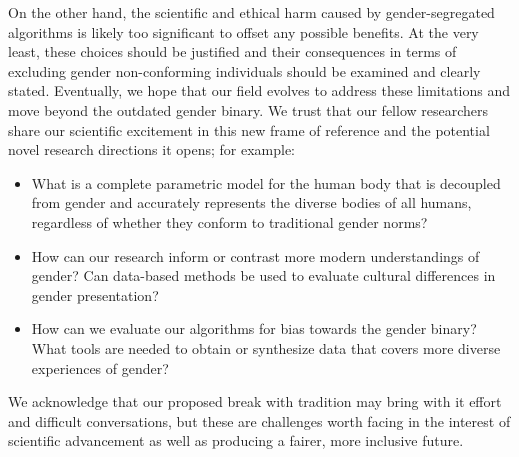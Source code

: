 \documentclass[nonacm,sigconf,review,balance=false]{acmart}
\begin{document}
On the other hand, the scientific and ethical harm caused by gender-segregated
algorithms is likely too significant to offset any possible benefits. At the
very least, these choices should be justified and their consequences in terms of
excluding gender non-conforming individuals should be examined and clearly
stated. Eventually, we hope that our field evolves to address these limitations
and move beyond the outdated gender binary. We trust that our fellow researchers
share our scientific excitement in this new frame of reference and the potential
novel research directions it opens; for example:
\begin{itemize}
    \item What is a complete parametric model for the human body that is
    decoupled from gender and accurately represents the diverse bodies of all
    humans, regardless of whether they conform to traditional gender norms?
    \item How can our research inform or contrast more modern understandings of
    gender? Can data-based methods be used to evaluate cultural differences in
    gender presentation?
    \item How can we evaluate our algorithms for bias towards the gender binary?
    What tools are needed to obtain or synthesize data that covers more diverse
    experiences of gender?
\end{itemize}

We acknowledge that our proposed break with tradition may bring with it effort
and difficult conversations, but these are challenges worth facing in the
interest of scientific advancement as well as producing a fairer, more inclusive
future.



\end{document}
